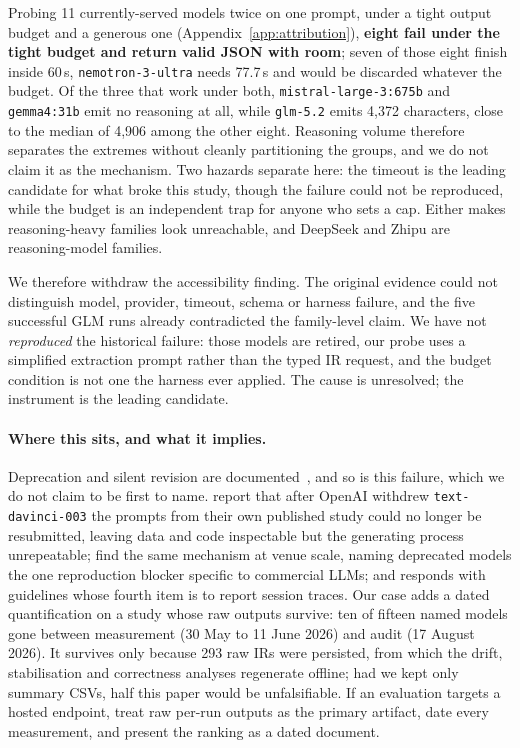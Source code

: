 \documentclass{article}
\begin{document}
Probing 11 currently-served models twice on one prompt, under a tight output budget and a generous one (Appendix~\ref{app:attribution}), \textbf{eight fail under the tight budget and return valid JSON with room}; seven of those eight finish inside 60\,s, \texttt{nemotron-3-ultra} needs 77.7\,s and would be discarded whatever the budget. Of the three that work under both, \texttt{mistral-large-3:675b} and \texttt{gemma4:31b} emit no reasoning at all, while \texttt{glm-5.2} emits 4{,}372 characters, close to the median of 4{,}906 among the other eight. Reasoning volume therefore separates the extremes without cleanly partitioning the groups, and we do not claim it as the mechanism. Two hazards separate here: the timeout is the leading candidate for what broke this study, though the failure could not be reproduced, while the budget is an independent trap for anyone who sets a cap. Either makes reasoning-heavy families look unreachable, and DeepSeek and Zhipu are reasoning-model families.

We therefore withdraw the accessibility finding. The original evidence could not distinguish model, provider, timeout, schema or harness failure, and the five successful GLM runs already contradicted the family-level claim. We have not \emph{reproduced} the historical failure: those models are retired, our probe uses a simplified extraction prompt rather than the typed IR request, and the budget condition is not one the harness ever applied. The cause is unresolved; the instrument is the leading candidate.

\paragraph{Where this sits, and what it implies.}
Deprecation and silent revision are documented~\citep{ma2024promptworse,chen2024chatgptdrift}, and so is this failure, which we do not claim to be first to name. \citet{johnson2024deprecating} report that after OpenAI withdrew \texttt{text-davinci-003} the prompts from their own published study could no longer be resubmitted, leaving data and code inspectable but the generating process unrepeatable; \citet{angermeir2025reproducibility} find the same mechanism at venue scale, naming deprecated models the one reproduction blocker specific to commercial LLMs; and \citet{baltes2026guidelines} responds with guidelines whose fourth item is to report session traces. Our case adds a dated quantification on a study whose raw outputs survive: ten of fifteen named models gone between measurement (30 May to 11 June 2026) and audit (17 August 2026). It survives only because 293 raw IRs were persisted, from which the drift, stabilisation and correctness analyses regenerate offline; had we kept only summary CSVs, half this paper would be unfalsifiable. If an evaluation targets a hosted endpoint, treat raw per-run outputs as the primary artifact, date every measurement, and present the ranking as a dated document.
\end{document}
